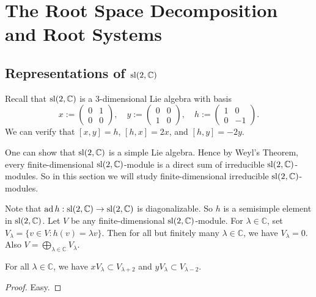 \chapter{The Root Space Decomposition and Root Systems}

\section{Representations of $\sl(2,\mathbb{C})$}

Recall that $\sl(2,\mathbb{C})$ is a 3-dimensional Lie algebra with basis 
\[
    x:=
    \left(
        \begin{array}{cc}
            0   &   1 \\
            0   &   0        
        \end{array}
    \right),\quad y:=
    \left(
        \begin{array}{cc}
            0   &   0 \\
            1   &   0        
        \end{array}
    \right),\quad h:=
    \left(
        \begin{array}{cc}
            1   &   0 \\
            0   &   -1        
        \end{array}
    \right).
\]
We can verify that $[x,y]=h$, $[h,x]=2x$, and $[h,y]=-2y$.

One can show that $\sl(2,\mathbb{C})$ is a simple Lie algebra. Hence by Weyl's Theorem, every finite-dimensional $\sl(2,\mathbb{C})$-module is a direct sum of irreducible $\sl(2,\mathbb{C})$-modules. So in this section we will study finite-dimensional irreducible $\sl(2,\mathbb{C})$-modules.

Note that $\ad h:\sl(2,\mathbb{C})\to \sl(2,\mathbb{C})$ is diagonalizable. So $h$ is a semisimple element in $\sl(2,\mathbb{C})$. Let $V$ be any finite-dimensional $\sl(2,\mathbb{C})$-module. For $\lambda\in\mathbb{C}$, set $V_\lambda=\{v\in V:h(v) = \lambda v\}$. Then for all but finitely many $\lambda\in\mathbb{C}$, we have $V_\lambda = 0$. Also $V=\bigoplus_{\lambda\in\mathbb{C}}V_\lambda$.
\begin{lem}
    For all $\lambda\in\mathbb{C}$, we have $x V_{\lambda}\subset V_{\lambda+2}$ and $y V_{\lambda}\subset V_{\lambda-2}$.
\end{lem}

\begin{proof}
    Easy.
\end{proof}

